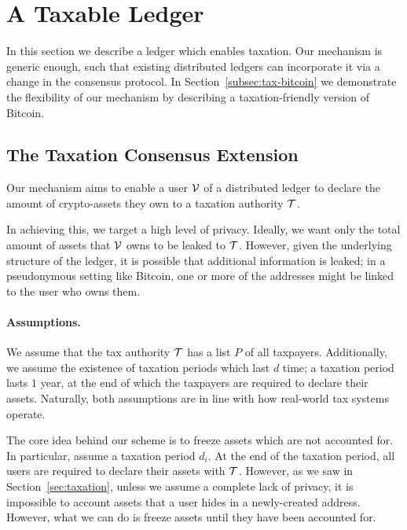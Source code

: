 \section{A Taxable Ledger}\label{sec:taxchain}

In this section we describe a ledger which enables taxation. Our mechanism is
generic enough, such that existing distributed ledgers can incorporate it via a
change in the consensus protocol. In Section~\ref{subsec:tax-bitcoin} we
demonstrate the flexibility of our mechanism by describing a taxation-friendly
version of Bitcoin.

\subsection{The Taxation Consensus Extension}\label{subsec:tax-ledger-extension}

Our mechanism aims to enable a user $\mathcal{V}$ of a distributed ledger to declare
the amount of crypto-assets they own to a taxation authority $\mathcal{T}$.

In achieving this, we target a high level of privacy. Ideally, we want only the
total amount of assets that $\mathcal{V}$ owns to be leaked to $\mathcal{T}$. However,
given the underlying structure of the ledger, it is possible that additional
information is leaked; \eg in a pseudonymous setting like Bitcoin, one or more
of the addresses might be linked to the user who owns them.

\paragraph{Assumptions.}

We assume that the tax authority $\mathcal{T}$ has a list $P$ of all taxpayers.
Additionally, we assume the existence of taxation periods which last $d$ time;
\eg a taxation period lasts $1$ year, at the end of which the taxpayers are
required to declare their assets. Naturally, both assumptions are in line with
how real-world tax systems operate.

The core idea behind our scheme is to freeze assets which are not accounted
for. In particular, assume a taxation period $d_i$. At the end of the taxation
period, all users are required to declare their assets with $\mathcal{T}$.
However, as we saw in Section~\ref{sec:taxation}, unless we assume a complete
lack of privacy, it is impossible to account assets that a user hides in a
newly-created address. However, what we can do is freeze assets until they have
been accounted for.

